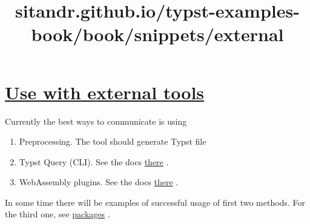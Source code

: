 \title{sitandr.github.io/typst-examples-book/book/snippets/external}

\section{\texorpdfstring{\hyperref[use-with-external-tools]{Use with
external
tools}}{Use with external tools}}\label{use-with-external-tools}

Currently the best ways to communicate is using

\begin{enumerate}
\tightlist
\item
  Preprocessing. The tool should generate Typst file
\item
  Typst Query (CLI). See the docs
  \href{https://typst.app/docs/reference/meta/query\#command-line-queries}{there}
  .
\item
  WebAssembly plugins. See the docs
  \href{https://typst.app/docs/reference/foundations/plugin/}{there} .
\end{enumerate}

In some time there will be examples of successful usage of first two
methods. For the third one, see \href{../packages/index.html}{packages}
.
